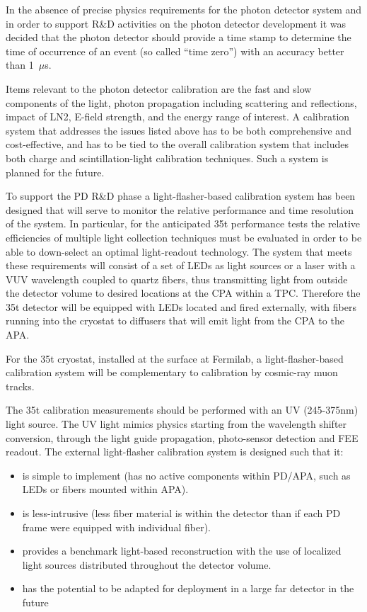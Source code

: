 In the absence of precise physics requirements
for the photon detector system and in order to support R\&D activities
on the photon detector development it was decided that the photon
detector should provide a time stamp to determine the time of
occurrence of an event (so called ``time zero'') with an accuracy
better than 1~$\mu$s.  

Items relevant to the photon detector calibration are the fast and
slow components of the light, photon propagation including scattering
and reflections, impact of LN2, E-field strength, and the energy range
of interest. A calibration system that addresses the issues listed
above has to be both comprehensive and cost-effective, and has to be
tied to the overall calibration system that includes both charge and
scintillation-light calibration techniques. Such a system is planned
for the future.

To support the PD R\&D phase a light-flasher-based calibration system
has been designed that will serve to monitor the relative performance
and time resolution of the system. In particular, for the anticipated
35t performance tests the relative efficiencies of multiple light
collection techniques must be evaluated in order to be able to
down-select an optimal light-readout technology. The system that meets
these requirements will consist of a set of LEDs as light sources or a
laser with a VUV wavelength coupled to quartz fibers, thus
transmitting light from outside the detector volume to desired
locations at the CPA within a TPC. Therefore the 35t detector will be
equipped with LEDs located and fired externally, with fibers running
into the cryostat to diffusers that will emit light from the CPA to
the APA.

For the 35t cryostat, installed at the surface at Fermilab, a
light-flasher-based calibration system will be complementary to
calibration by cosmic-ray muon tracks.

The 35t calibration measurements should be performed with an UV
(245-375nm) light source. The UV light mimics physics starting from
the wavelength shifter conversion, through the light guide
propagation, photo-sensor detection and FEE readout.  The external
light-flasher calibration system is designed such that it:
\begin{itemize}
\item is simple to implement (has no active components within PD/APA, such as
  LEDs or fibers mounted within APA).
\item is less-intrusive (less fiber material is within the detector
  than if each PD frame were equipped with individual fiber).
  \item
  provides a benchmark light-based reconstruction with the use of
  localized light sources distributed throughout the detector volume.
\item has the potential to be adapted for deployment in a large far
  detector in the future
\end{itemize}

